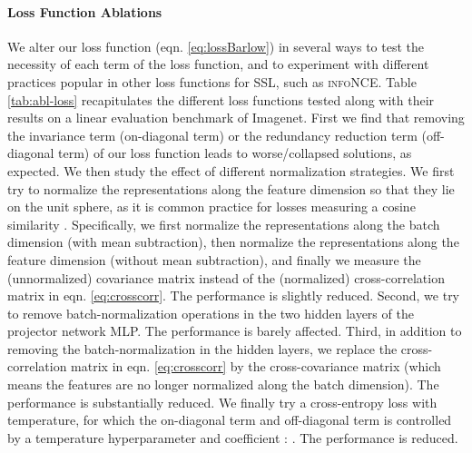 \documentclass{article}
\begin{document}
\paragraph{Loss Function Ablations} 
We alter our loss function (eqn. \ref{eq:lossBarlow}) in several ways to test the necessity of each term of the loss function, and to experiment with different practices popular in other loss functions for SSL, such as \textsc{infoNCE}.  Table \ref{tab:abl-loss} recapitulates the different loss functions tested along with their results on a linear evaluation benchmark of Imagenet. First we find that removing the invariance term (on-diagonal term) or the redundancy reduction term (off-diagonal term) of our loss function leads to worse/collapsed solutions, as expected. We then study the effect of different normalization strategies. We first try to normalize the representations along the feature dimension so that they lie on the unit sphere, as it is common practice for losses measuring a cosine similarity \cite{chen2020simple,grill2020bootstrap,wang_understanding_2020}. Specifically, we first normalize the representations along the batch dimension (with mean subtraction), then normalize the representations along the feature dimension (without mean subtraction), and finally we measure the (unnormalized) covariance matrix instead of the (normalized) cross-correlation matrix in eqn. \ref{eq:crosscorr}. The performance is slightly reduced. Second, we try to remove batch-normalization operations in the two hidden layers of the projector network MLP. The performance is barely affected. Third, in addition to removing the batch-normalization in the hidden layers, we replace the cross-correlation matrix in eqn. \ref{eq:crosscorr} by the cross-covariance matrix (which means the features are no longer normalized along the batch dimension). The performance is substantially reduced. We finally try a cross-entropy loss with temperature, for which the on-diagonal term and off-diagonal term is controlled by a temperature hyperparameter  and coefficient : 
. The performance is reduced.
\end{document}
